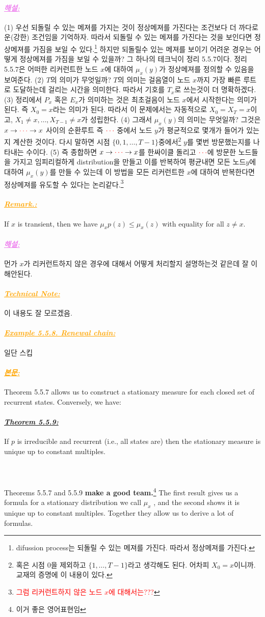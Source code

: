 \documentclass[12pt,oneside,english,a4paper]{article}
\def\bk{\paragraph{\LARGE$$}\LARGE}
\newcommand{\para}[1]{\paragraph{\LARGE\it\underline{\textbf{#1:}}}\LARGE}
\newcommand{\paraviolet}[1]{\paragraph{\LARGE\textcolor{violet}{\it\underline{\textbf{#1:}}}}\LARGE}
\newcommand{\paraorange}[1]{\paragraph{\LARGE\textcolor{orange}{\it\underline{\textbf{#1:}}}}\LARGE}
\begin{document}
\paraviolet{해설} (1) 우선 되돌릴 수 있는 메져를 가지는 것이 정상메져를 가진다는 조건보다 더 까다로운(강한) 조건임을 기억하자. 따라서 되돌릴 수 있는 메져를 가진다는 것을 보인다면 정상메져를 가짐을 보일 수 있다.\footnote{difussion process는 되돌릴 수 있는 메져를 가진다. 따라서 정상메져를 가진다.} 하지만 되돌릴수 있는 메져를 보이기 어려운 경우는 어떻게 정상메져를 가짐을 보일 수 있을까? 그 하나의 테크닉이 정리 5.5.7이다. 정리 5.5.7은 어떠한 리커런트한 노드 $x$에 대하여 $\mu_x(y)$가 정상메져를 정의할 수 있음을 보여준다. (2) $T$의 의미가 무엇일까? $T$의 의미는 걸음열이 노드 $x$까지 가장 빠른 루트로 도달하는데 걸리는 시간을 의미한다. 따라서 기호를 $T_x$로 쓰는것이 더 명확하겠다. (3) 정리에서 $P_x$ 혹은 $E_x$가 의미하는 것은 최초걸음이 노드 $x$에서 시작한다는 의미가 된다. 즉 $X_0=x$라는 의미가 된다. 따라서 이 문제에서는 자동적으로 $X_0=X_T=x$이고, $X_1\neq x,\dots, X_{T-1}\neq x$가 성립한다. (4) 그래서 $\mu_x(y)$의 의미는 무엇일까? 그것은 $x\to \textcolor{red}{\cdots} \to x$ 사이의 순환루트 즉 $\textcolor{red}{\cdots}$ 중에서 노드 $y$가 평균적으로 몇개가 들어가 있는지 계산한 것이다. 다시 말하면 시점 $\{0,1,\dots,T-1\}$중에서\footnote{혹은 시점 0을 제외하고 $\{1,\dots,T-1\}$라고 생각해도 된다. 어차피 $X_0=x$이니까. 교재의 증명에 이 내용이 있다.} $y$를 몇번 방문했는지를 나타내는 수이다. (5) 즉 종합하면 $x \to \textcolor{red}{\cdots} \to x$를 한싸이클 돌리고 $\textcolor{red}{\cdots}$에 방문한 노드들을 가지고 임피리컬하게 distribution을 만들고 이를 반복하여 평균내면 모든 노드$y$에 대하여 $\mu_x(y)$를 만들 수 있는데 이 방법을 모든 리커런트한 $x$에 대하여 반복한다면 정상메져를 유도할 수 있다는 논리같다.\footnote{\textcolor{red}{그럼 리커런트하지 않은 노드 $x$에 대해서는???}}

\paraorange{Remark.} If $x$ is transient, then we have $\mu_xp(z) \leq \mu_x(z)$ with equality for all $z \neq x$.
\paraviolet{해설} 먼가 $x$가 리커런트하지 않은 경우에 대해서 어떻게 처리할지 설명하는것 같은데 잘 이해안된다. 

\paraorange{Technical Note} 이 내용도 잘 모르겠음. 

\paraorange{Example 5.5.8. Renewal chain} 일단 스킵

\paraorange{본문} Theorem 5.5.7 allows us to construct a stationary measure for each closed set of recurrent states. Conversely, we have:

\para{Theorem 5.5.9} If $p$ is irreducible and recurrent (i.e., all states are) then the stationary measure is unique up to constant multiples.

\bk Theorems 5.5.7 and 5.5.9 {\bf make a good team.}\footnote{이거 좋은 영어표현임} The first result gives us
a formula for a stationary distribution we call $\mu_x$ , and the second shows it is unique up to constant multiples. Together they allow us to derive a lot of formulas.
\end{document}
